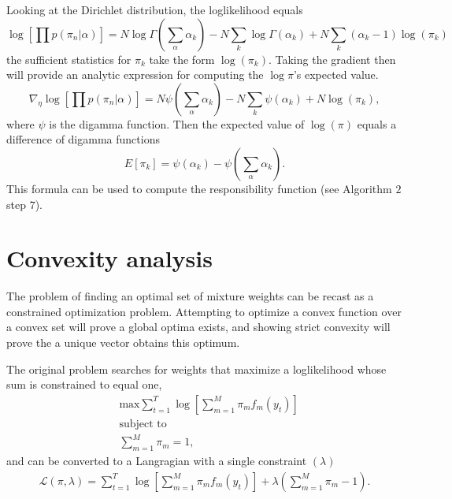 \documentclass[sagev,times,Review,10pt]{sagej}
\def\l{\left}
\def\r{\right}
\begin{document}
\begin{appendix}
Looking at the Dirichlet distribution, the loglikelihood equals
\begin{equation}
  \log \l [ \prod p(\pi_{n}|\alpha) \r] = N \log \Gamma \l(\sum_{\alpha} \alpha_{k}\r) - N \sum_{k} \log \Gamma \l(\alpha_{k}\r) + N \sum_{k} (\alpha_{k}-1) \log(\pi_{k})
\end{equation}
the sufficient statistics for $\pi_{k}$ take the form $\log \l( \pi_{k}\r)$.
Taking the gradient then will provide an analytic expression for computing the $\log \pi$'s expected value.
\begin{equation}
 \nabla_{\eta} \log \l [ \prod p(\pi_{n}|\alpha) \r] = N \psi \l(\sum_{\alpha} \alpha_{k}\r) - N \sum_{k} \psi \l(\alpha_{k}\r) + N \log(\pi_{k}),
\end{equation}
where $\psi$ is the digamma function.
Then the expected value of $\log\l(\pi\r)$ equals a difference of digamma functions
\begin{equation}
  E\l[\pi_{k}\r] = \psi\l(\alpha_{k}\r) -  \psi \l(\sum_{\alpha} \alpha_{k}\r).
\end{equation}
This formula can be used to compute the responsibility function (see Algorithm $2$ step $7$).

\section{Convexity analysis}
\label{convexity}

The problem of finding an optimal set of mixture weights can be recast as a constrained optimization problem.
Attempting to optimize a convex function over a convex set will prove a global optima exists, and showing strict convexity will prove the a unique vector obtains this optimum.

The original problem searches for weights that maximize a loglikelihood whose sum is constrained to equal one,
\begin{align}
    &\text{max} \sum_{t=1}^{T} \log \l[ \sum_{m=1}^{M} \pi_mf_{m}(y_{t}) \r] \label{oFunc}\\
    &\text{subject to} \nonumber \\ 
    &   \sum_{m=1}^{M} \pi_{m} = 1 \nonumber,
\end{align}
and can be converted to a Langragian with a single constraint $(\lambda)$
\begin{align}
  \mathcal{L}(\pi,\lambda) = \sum_{t=1}^{T} \log \l[ \sum_{m=1}^{M} \pi_mf_{m}(y_{t}) \r]  +\lambda \l( \sum_{m=1}^{M} \pi_m-1 \r) \nonumber.
\end{align}


\end{appendix}
\end{document}
